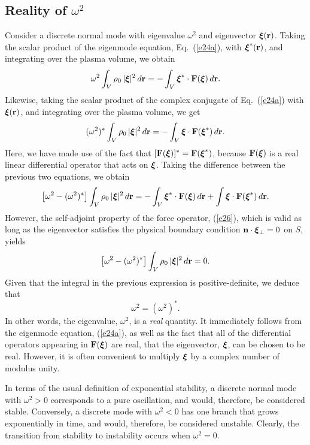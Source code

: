\documentclass[12pt,prb,aps,notitlepage]{revtex4-1}
\newcommand{\bxi}{\mbox{\boldmath$\xi$}}
\begin{document}
\subsection{Reality of $\omega^2$}
Consider a discrete normal mode with eigenvalue $\omega^2$ and eigenvector $\bxi({\bf r})$. 
Taking the scalar product of the eigenmode equation, Eq.~(\ref{e24a}), with $\bxi^\ast({\bf r})$, and integrating over the plasma volume, we obtain
\begin{equation}
\omega^2\int_V\rho_0\,|\bxi|^2\,d{\bf r} = - \int_V\bxi^\ast\cdot {\bf F}(\bxi)\,d{\bf r}.
\end{equation}
Likewise, taking the scalar product of the complex conjugate of Eq.~(\ref{e24a}) with $\bxi({\bf r})$, and integrating over the plasma
volume, we get
\begin{equation}
(\omega^2)^\ast\int_V\rho_0\,|\bxi|^2\,d{\bf r} = - \int_V\bxi\cdot {\bf F}(\bxi^\ast)\,d{\bf r}.
\end{equation}
Here, we have made use of the fact that $[{\bf F}(\bxi)]^\ast={\bf F}(\bxi^\ast)$, because ${\bf F}(\bxi)$ is a real linear differential operator
that acts on $\bxi$. 
Taking the difference between the previous two equations, we obtain
\begin{equation}
\left[\omega^2 - (\omega^2)^\ast\right]\int_V\rho_0\,|\bxi|^2\,d{\bf r}=  - \int_V\bxi^\ast\cdot {\bf F}(\bxi)\,d{\bf r}+ \int\bxi\cdot {\bf F}(\bxi^\ast)\,d{\bf r}.
\end{equation}
However, the self-adjoint property of the force operator, (\ref{e26}), which is valid as long as the eigenvector satisfies the physical
boundary condition ${\bf n}\cdot\bxi_\perp=0$ on $S$, 
yields
\begin{equation}
\left[\omega^2 - (\omega^2)^\ast\right]\int_V\rho_0\,|\bxi|^2\,d{\bf r}=0.
\end{equation}
Given that the integral in the previous expression is positive-definite, we deduce that 
\begin{equation}
\omega^2 = (\omega^2)^\ast.
\end{equation}
In other words,  the eigenvalue, $\omega^2$,  is a {\em real}\/ quantity. It immediately follows  from the eigenmode
equation, (\ref{e24a}), as well as the fact that all of the differential operators appearing in ${\bf F}(\bxi)$ are real,  that the eigenvector, 
$\bxi$, can be chosen to be real. However, it is often convenient to multiply $\bxi$ by a complex number of modulus unity. 

In terms of the usual definition of exponential stability, a discrete normal mode with $\omega^2>0$ corresponds to a pure oscillation, and would, therefore,
be considered stable. Conversely, a discrete mode with $\omega^2<0$ has one branch that grows exponentially in time, and
would, therefore, be considered unstable. Clearly, the transition from stability to instability occurs when $\omega^2=0$. 
\end{document}
